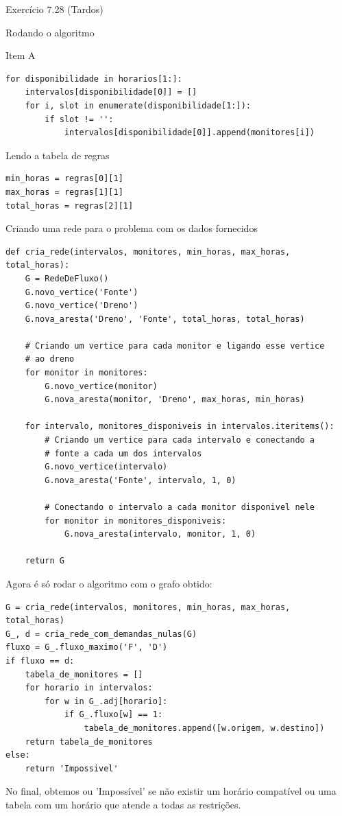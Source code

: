 \documentclass[presentation]{beamer}
\begin{document}
\begin{frame}[fragile,label=sec-2]{Exercício 7.28 (Tardos)}
\begin{block}{Rodando o algoritmo}
\begin{block}{Item A}
\begin{verbatim}
for disponibilidade in horarios[1:]:
    intervalos[disponibilidade[0]] = []
    for i, slot in enumerate(disponibilidade[1:]):
        if slot != '':
            intervalos[disponibilidade[0]].append(monitores[i])
\end{verbatim}

Lendo a tabela de regras
\begin{verbatim}
min_horas = regras[0][1]
max_horas = regras[1][1]
total_horas = regras[2][1]
\end{verbatim}

Criando uma rede para o problema com os dados fornecidos

\begin{verbatim}
def cria_rede(intervalos, monitores, min_horas, max_horas, total_horas):
    G = RedeDeFluxo()
    G.novo_vertice('Fonte')
    G.novo_vertice('Dreno')
    G.nova_aresta('Dreno', 'Fonte', total_horas, total_horas)

    # Criando um vertice para cada monitor e ligando esse vertice
    # ao dreno
    for monitor in monitores:
        G.novo_vertice(monitor)
        G.nova_aresta(monitor, 'Dreno', max_horas, min_horas)

    for intervalo, monitores_disponiveis in intervalos.iteritems():
        # Criando um vertice para cada intervalo e conectando a
        # fonte a cada um dos intervalos
        G.novo_vertice(intervalo)
        G.nova_aresta('Fonte', intervalo, 1, 0)

        # Conectando o intervalo a cada monitor disponivel nele
        for monitor in monitores_disponiveis:
            G.nova_aresta(intervalo, monitor, 1, 0)

    return G
\end{verbatim}

Agora é só rodar o algoritmo com o grafo obtido:
\begin{verbatim}
G = cria_rede(intervalos, monitores, min_horas, max_horas, total_horas)
G_, d = cria_rede_com_demandas_nulas(G)
fluxo = G_.fluxo_maximo('F', 'D')
if fluxo == d:
    tabela_de_monitores = []
    for horario in intervalos:
        for w in G_.adj[horario]:
            if G_.fluxo[w] == 1:
                tabela_de_monitores.append([w.origem, w.destino])
    return tabela_de_monitores
else:
    return 'Impossivel'
\end{verbatim}

No final, obtemos ou 'Impossível' se não existir um horário compatível
ou uma tabela com um horário que atende a todas as restrições.


\end{block}
\end{block}
\end{frame}
\end{document}
